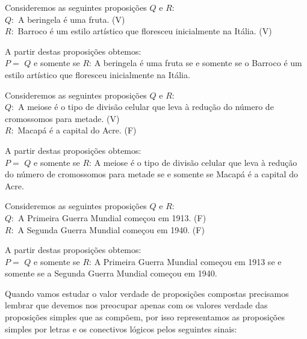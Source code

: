 \begin{itemize}
 
 \begin{exem} \label{(Sse 1)}
 Consideremos as seguintes proposições $Q$ e $R$:\\
 $Q:$ A beringela é uma fruta. (V) \\
 $R:$ Barroco é um estilo artístico que floresceu inicialmente na Itália. (V)
 
 A partir destas proposições obtemos:\\
 $P=$ $Q$ e somente se $R$: A beringela é uma fruta se e somente se o Barroco é um estilo artístico que floresceu inicialmente na Itália.
 \end{exem}

 \begin{exem} \label{(Sse 2)}
 Consideremos as seguintes proposições $Q$ e $R$:\\
 $Q:$ A meiose é o tipo de divisão celular que leva à redução do número de cromossomos para metade. (V) \\
 $R:$ Macapá é a capital do Acre. (F)
 
 A partir destas proposições obtemos:\\
 $P=$ $Q$ e somente se $R$:  A meiose é o tipo de divisão celular que leva à redução do número de cromossomos para metade se e somente se Macapá é a capital do Acre.
 \end{exem}  
 
 \begin{exem} \label{(Sse 3)}
 Consideremos as seguintes proposições $Q$ e $R$:\\
 $Q:$ A Primeira Guerra Mundial começou em 1913.  (F) \\
 $R:$ A Segunda Guerra Mundial começou em 1940. (F)
 
 A partir destas proposições obtemos:\\
 $P=$ $Q$ e somente se $R$:  A Primeira Guerra Mundial começou em 1913 se e somente se a Segunda Guerra Mundial começou em 1940. 
 \end{exem}  
 
 \end{itemize}

 Quando vamos estudar o valor verdade de proposições compostas precisamos lembrar que devemos nos preocupar apenas com os valores verdade das proposições simples que as compõem, por isso representamos as proposições simples por letras e os conectivos lógicos pelos seguintes sinais:

